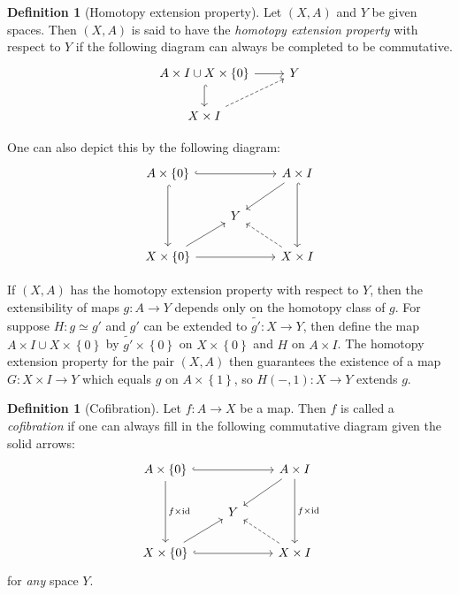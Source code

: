 \documentclass[reqno]{amsart}
\theoremstyle{definition}
\newtheorem{definition}[theorem]{Definition}
\theoremstyle{remark}
\newcommand{\id}{{\mathrm{id}}}
\begin{document}
\begin{definition}[Homotopy extension property]
    Let $\left( X,A \right) $ and $Y $ be given spaces.
    Then $\left( X, A \right) $ is said to have
    the \textit{homotopy extension property} with respect to
    $Y$ if the following diagram can always be completed
    to be commutative.
    \begin{equation*}
    \begin{tikzcd}
        A \times I \cup X \times \left\{ 0 \right\} 
        \ar[r] \ar[d, hookrightarrow] & Y\\
        X \times I \ar[ru, dashed]
    \end{tikzcd}
    \end{equation*}

    One can also depict this by the following diagram:
    \begin{equation*}
    \begin{tikzcd}
        A \times \left\{ 0 \right\} \ar[rr, hookrightarrow]
        \ar[dd, hookrightarrow] 
        & & A \times I \ar[dd, hookrightarrow] \ar[ld] \\
        & Y & \\
        X \times \left\{ 0 \right\} \ar[ru] \ar[rr] && X \times I
        \ar[lu, dashed]
    \end{tikzcd}
    \end{equation*}
\end{definition}

If $\left( X,A \right) $ has the homotopy extension property
with respect to $Y$, then the extensibility of maps
$g \colon A \to Y$ depends only on the homotopy class of
$g$. For suppose $H \colon g \simeq g'$ and $g'$ can be
extended to  $\tilde{g'} \colon X \to Y$, 
then define the map
$A \times I \cup  X \times \left\{ 0 \right\} $ by
$\tilde{g'} \times \left\{ 0 \right\} $ on
$X \times \left\{ 0 \right\} $ and
$H$ on $A \times I$. The homotopy extension property for the
pair $(X,A)$ then guarantees the existence of a map
$G \colon X \times I \to Y$ which equals
$g$ on $A \times \left\{ 1 \right\} $, so
$H \left( -,1 \right) \colon X \to Y$ extends $g$.

\begin{definition}[Cofibration]
    Let $f \colon A \to X$ be a map. Then $f$ is called
    a \textit{cofibration} if one can always fill in the following
    commutative diagram given the solid arrows:
    \begin{equation*}
    \begin{tikzcd}
        A \times \left\{ 0 \right\} \ar[dd, "f \times \id"] 
        \ar[rr, hookrightarrow]
        & & A\times I \ar[dd, "f \times \id"] \ar[dl] \\
            & Y &\\
        X \times \left\{ 0 \right\} \ar[ru]
        \ar[rr, hookrightarrow]& & X \times I 
        \ar[lu, dashed]
    \end{tikzcd}
    \end{equation*}
    for \textit{any} space $Y$.
\end{definition}
\end{document}
